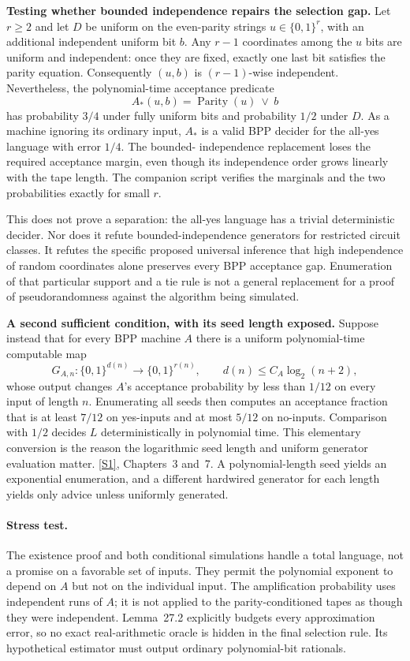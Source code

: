 \documentclass[11pt,a4paper]{article}
\newcommand{\sref}[2]{\hyperlink{source:#1:#2}{[S#2]}}
\numberwithin{equation}{section}
\begin{document}
\medskip
\textbf{Testing whether bounded independence repairs the selection gap.}
Let $r\ge2$ and let $D$ be uniform on the even-parity strings
$u\in\{0,1\}^r$, with an additional independent uniform bit $b$.
Any $r-1$ coordinates among the $u$ bits are uniform and independent:
once they are fixed, exactly one last bit satisfies the parity equation.
Consequently $(u,b)$ is $(r-1)$-wise independent. Nevertheless, the
polynomial-time acceptance predicate
\begin{equation}\label{r27:parity}
                 A_*(u,b)=\operatorname{Parity}(u)\ \lor\ b
\end{equation}
has probability $3/4$ under fully uniform bits and probability $1/2$
under $D$. As a machine ignoring its ordinary input, $A_*$ is a valid
BPP decider for the all-yes language with error $1/4$. The bounded-
independence replacement loses the required acceptance margin, even
though its independence order grows linearly with the tape length.
The companion script verifies the marginals and the two probabilities
exactly for small $r$.

This does not prove a separation: the all-yes language has a trivial
deterministic decider. Nor does it refute bounded-independence generators
for restricted circuit classes. It refutes the specific proposed
universal inference that high independence of random coordinates alone
preserves every BPP acceptance gap. Enumeration of that particular
support and a tie rule is not a general replacement for a proof of
pseudorandomness against the algorithm being simulated.

\medskip
\textbf{A second sufficient condition, with its seed length exposed.}
Suppose instead that for every BPP machine $A$ there is a uniform
polynomial-time computable map
\[
 G_{A,n}:\{0,1\}^{d(n)}\longrightarrow\{0,1\}^{r(n)},
             \qquad d(n)\le C_A\log_2(n+2),
\]
whose output changes $A$'s acceptance probability by less than $1/12$
on every input of length $n$. Enumerating all seeds then computes an
acceptance fraction that is at least $7/12$ on yes-inputs and at most
$5/12$ on no-inputs. Comparison with $1/2$ decides $L$ deterministically
in polynomial time. This elementary conversion is the reason the
logarithmic seed length and uniform generator evaluation matter.
\sref{27}{1}, Chapters~3 and~7. A polynomial-length seed yields an
exponential enumeration, and a different hardwired generator for each
length yields only advice unless uniformly generated.

\paragraph{Stress test.}
The existence proof and both conditional simulations handle a total
language, not a promise on a favorable set of inputs. They permit the
polynomial exponent to depend on $A$ but not on the individual input.
The amplification probability uses independent runs of $A$; it is not
applied to the parity-conditioned tapes as though they were independent.
Lemma~27.2 explicitly budgets every approximation error, so no exact
real-arithmetic oracle is hidden in the final selection rule. Its
hypothetical estimator must output ordinary polynomial-bit rationals.
\end{document}
